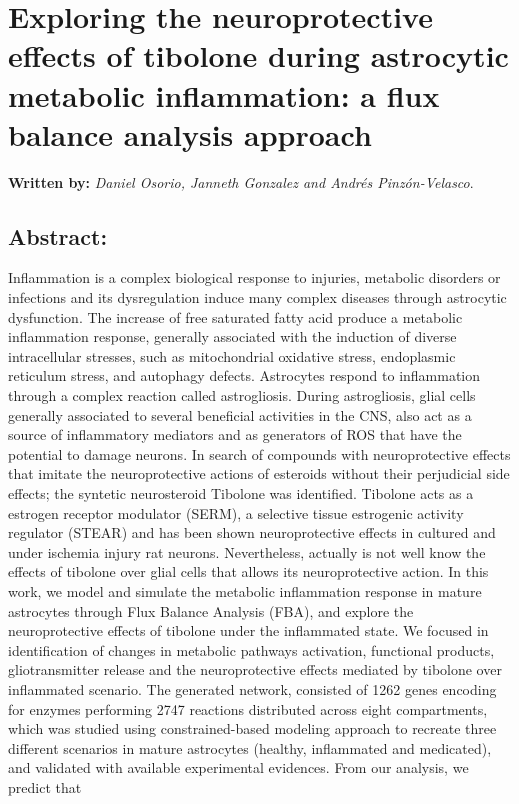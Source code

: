 \chapter{Exploring the neuroprotective effects of tibolone during astrocytic metabolic inflammation: a flux balance analysis approach}
\textbf{Written by:} \textit{Daniel Osorio, Janneth Gonzalez and Andrés Pinzón-Velasco}.
\section*{Abstract:}
Inflammation is a complex biological response to injuries, metabolic disorders or infections and its dysregulation induce many complex diseases through astrocytic dysfunction. The increase of free saturated fatty acid produce a metabolic inflammation response, generally associated with the induction of diverse intracellular stresses, such as mitochondrial oxidative stress, endoplasmic reticulum stress, and autophagy defects.  Astrocytes respond to inflammation through a complex reaction called astrogliosis. During astrogliosis, glial cells generally associated to several beneficial activities in the CNS, also act as a source of inflammatory mediators and as generators of ROS that have the potential to damage neurons. In search of compounds with neuroprotective effects that imitate the neuroprotective actions of esteroids without their perjudicial side effects; the syntetic neurosteroid Tibolone was identified. Tibolone acts as a estrogen receptor modulator (SERM), a selective tissue estrogenic activity regulator (STEAR) and has been shown neuroprotective effects in cultured and under ischemia injury rat neurons. Nevertheless, actually is not well know the effects of tibolone over glial cells that allows its neuroprotective action. In this work, we model and simulate the metabolic inflammation response in mature astrocytes through Flux Balance Analysis (FBA), and explore the neuroprotective effects of tibolone under the inflammated state. We focused in identification of changes in metabolic pathways activation, functional products, gliotransmitter release and the neuroprotective effects mediated by tibolone over inflammated scenario. The generated network, consisted of 1262 genes encoding for enzymes performing 2747 reactions distributed across eight compartments, which was studied using constrained-based modeling approach to recreate three different scenarios in mature astrocytes (healthy, inflammated and medicated), and validated with available experimental evidences. From our analysis, we predict that
